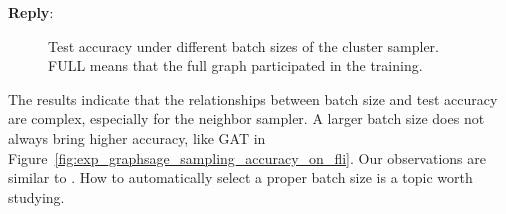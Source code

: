 \documentclass[12pt]{article}
\newenvironment{reply}
   {\medskip \noindent \textbf{Reply}:\  }
   {\medskip}
\begin{document}
\begin{reply}
        \begin{figure}[h]
            \centering
            \caption{Test accuracy under different batch sizes of the cluster sampler. FULL means that the full graph participated in the training.}
            \label{fig:exp_sampling_relative_batch_size_accuracy_cluster}
        \end{figure}
    
    The results indicate that the relationships between batch size and test accuracy are complex, especially for the neighbor sampler.
    A larger batch size does not always bring higher accuracy, like GAT in Figure~\ref{fig:exp_graphsage_sampling_accuracy_on_fli}. 
    Our observations are similar to \cite{zeng2020_graphsaint}.
    How to automatically select a proper batch size is a topic worth studying.
\end{reply}
\end{document}
